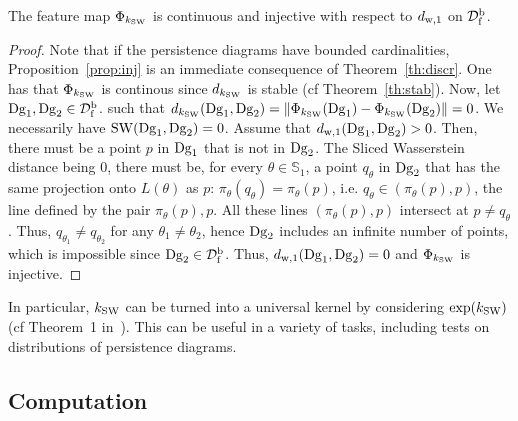 \begin{prop}\label{prop:inj}
The feature map $\Phi_{k_{\rm SW}}$ %
is continuous and injective with respect to $d_{{\rm w},1}$ on ${\mathcal D}_{\rm f}^{\rm b}$.
\end{prop}	

\begin{proof}
Note that if the persistence diagrams have bounded cardinalities, Proposition~\ref{prop:inj} 
is an immediate consequence of Theorem~\ref{th:discr}.
One has that $\Phi_{k_{\rm SW}}$ is continous since $d_{k_{\rm SW}}$ is stable (cf Theorem~\ref{th:stab}).
Now, let $\mathrm{Dg}_1,\mathrm{Dg}_2\in {\mathcal D}_{\rm f}^{\rm b}$. %
such that  $d_{k_{\rm SW}}(\mathrm{Dg}_1,\mathrm{Dg}_2)=\|\Phi_{k_{\rm SW}}(\mathrm{Dg}_1)-\Phi_{k_{\rm SW}}(\mathrm{Dg}_2)\|=0$. 
We necessarily have ${\rm SW}(\mathrm{Dg}_1,\mathrm{Dg}_2)=0$.
Assume that $d_{{\rm w},1}(\mathrm{Dg}_1,\mathrm{Dg}_2)>0$. 
Then, there must be a point $p$ in $\mathrm{Dg}_1$ 
that is not in $\mathrm{Dg}_2$.
The Sliced Wasserstein distance being $0$, there must be, for every $\theta\in\mathbb{S}_1$, 
a point $q_\theta$ in $\mathrm{Dg}_2$ 
that has the same projection onto $L(\theta)$ as $p$: $\pi_\theta(q_\theta)=\pi_\theta(p)$, i.e. 
$q_\theta\in(\pi_\theta(p),p)$, the line defined by the pair $\pi_\theta(p),p$. 
All these lines $(\pi_\theta(p),p)$ intersect at $p\neq q_\theta$.
Thus, $q_{\theta_1}\neq q_{\theta_2}$ for any $\theta_1\neq \theta_2$, hence $\mathrm{Dg}_2$
includes an infinite number of points,
which is impossible since $\mathrm{Dg}_2\in{\mathcal D}_{\rm f}^{\rm b}$. Thus, $d_{{\rm w},1}(\mathrm{Dg}_1,\mathrm{Dg}_2)=0$ and $\Phi_{k_{\rm SW}}$ is injective. 
\end{proof}

In particular, $k_{\rm SW}$ can be turned into a universal kernel by considering ${\rm exp}(k_{\rm SW})$  (cf Theorem~1 in~\cite{Kwitt15}).
This can be useful in a variety of tasks, including tests on distributions of persistence diagrams.

\subsection{Computation}
\label{sec:comput}

